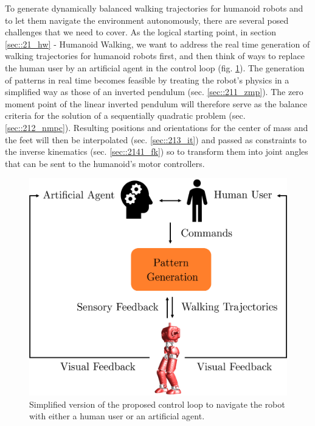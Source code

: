 \label{sec::2_bg}
To generate dynamically balanced walking trajectories for humanoid robots and to let them navigate the environment autonomously, there are several posed challenges that we need to cover. As the logical starting point, in section \ref{sec::21_hw} - Humanoid Walking, we want to address the real time generation of walking trajectories for humanoid robots first, and then think of ways to replace the human user by an artificial agent in the control loop (fig. \ref{fig::2_cl}). The generation of patterns in real time becomes feasible by treating the robot's physics in a simplified way as those of an inverted pendulum (sec. \ref{sec::211_zmp}). The zero moment point of the linear inverted pendulum will therefore serve as the balance criteria for the solution of a sequentially quadratic problem (sec. \ref{sec::212_nmpc}).  Resulting positions and orientations for the center of mass and the feet will then be interpolated (sec. \ref{sec::213_it}) and passed as constraints to the inverse kinematics (sec. \ref{sec::2141_fk}) so to transform them into joint angles that can be sent to the humanoid's motor controllers.
\begin{figure}[h!]
	\centering
	\includegraphics[scale=.5]{chapters/02_background/img/control_loop.png}
	\caption{Simplified version of the proposed control loop to navigate the robot with either a human user or an artificial agent.}
	\label{fig::2_cl}
\end{figure}
\\
